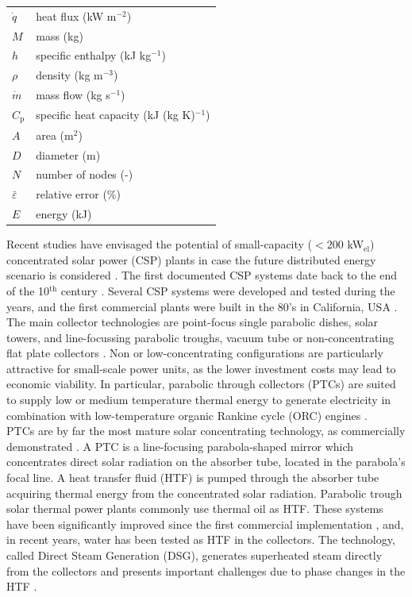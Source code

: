 \documentclass[final,3p,times,review]{elsarticle}
\begin{document}
\begin{table}[h!]
\begin{tabular}{lp{7.5cm}}
$\dot{q}$& heat flux (kW m$^{-2}$) \\
$M$ & mass (kg)\\
$h$ & specific enthalpy (kJ kg$^{-1}$)\\
$\rho$ & density (kg m$^{-3}$)\\
$\dot{m}$& mass flow (kg s$^{-1}$) \\
$ C_\mathrm{p} $& specific heat capacity (kJ (kg K)$^{-1}$) \\
$A$ & area (m$^{2}$)\\
$D$ & diameter (m)\\
$N$ & number of nodes (-)\\
$\bar{\varepsilon}$ & relative error (\%)\\
$E$ & energy  (kJ)\\
\end{tabular}
\end{table}
%
Recent studies have envisaged the potential of small-capacity ($<200$ kW$_\mathrm{el}$) concentrated solar power (CSP) plants in case the future distributed energy scenario is considered \cite{Casati2012a,Prabhu2006}. The first documented CSP systems date back to the end of the 10$^\mathrm{th}$ century \cite{Butti_1980}. Several CSP systems were developed and tested during the years, and the first commercial plants were built in the 80's in California, USA \cite{IRENA_CSP_2013}.  The main collector technologies are point-focus single parabolic dishes, solar towers, and line-focussing parabolic troughs, vacuum tube or non-concentrating flat plate collectors \cite{Winter1991}. Non or low-concentrating configurations are particularly attractive for small-scale power units, as the lower investment costs may lead to economic viability. In particular,  parabolic through collectors (PTCs) are suited to supply low or medium temperature thermal energy to generate electricity in combination with low-temperature organic Rankine cycle (ORC) engines \cite{Verneau1978,Angelino1984Areview}.\\

PTCs are by far the most mature solar concentrating technology, as commercially demonstrated  \cite{Fernandez_Garcia2010}. 
 A PTC is a line-focusing  parabola-shaped mirror which concentrates direct solar radiation on the absorber tube, located in the parabola's focal line. A heat transfer fluid (HTF) is pumped through the absorber tube acquiring thermal energy from the concentrated solar radiation. Parabolic trough solar thermal power plants commonly use thermal oil as HTF. These systems have been significantly improved since the first commercial implementation \cite{Canada_Saguaro_2005}, and, in recent years, water has been tested as HTF in the collectors. The technology, called Direct Steam Generation (DSG),  generates  superheated steam directly from the collectors and presents important challenges due to phase changes in the HTF \cite{Bonilla_MB_2015}.\\
\end{document}
